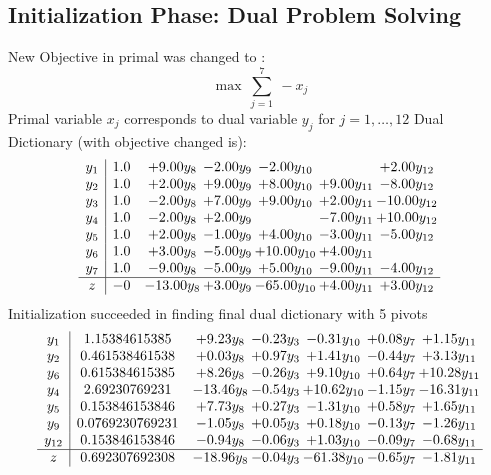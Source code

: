\documentclass[8pt]{article}
\begin{document}
\subsection{Initialization Phase: Dual Problem Solving}
New Objective in primal was changed to : \[ \max\ \sum_{j=1}^{7}\ - x_j \] 
Primal variable $x_j$ corresponds to dual variable $y_j$ for $j = 1,\ldots,12$
Dual Dictionary (with objective changed is): 
\[\begin{array}{c| c c@{\hskip 2pt} c@{\hskip 2pt} c@{\hskip 2pt} c@{\hskip 2pt} c@{\hskip 2pt} }
 y_{1}   &  1.0 & +  9.00 y_{8} & -2.00 y_{9} & -2.00 y_{10} &   & +  2.00 y_{12}\\
 y_{2}   &  1.0 & +  2.00 y_{8} & +  9.00 y_{9} & +  8.00 y_{10} & +  9.00 y_{11} & -8.00 y_{12}\\
 y_{3}   &  1.0 & -2.00 y_{8} & +  7.00 y_{9} & +  9.00 y_{10} & +  2.00 y_{11} & -10.00 y_{12}\\
 y_{4}   &  1.0 & -2.00 y_{8} & +  2.00 y_{9} &   & -7.00 y_{11} & + 10.00 y_{12}\\
 y_{5}   &  1.0 & +  2.00 y_{8} & -1.00 y_{9} & +  4.00 y_{10} & -3.00 y_{11} & -5.00 y_{12}\\
 y_{6}   &  1.0 & +  3.00 y_{8} & -5.00 y_{9} & + 10.00 y_{10} & +  4.00 y_{11} &   \\
 y_{7}   &  1.0 & -9.00 y_{8} & -5.00 y_{9} & +  5.00 y_{10} & -9.00 y_{11} & -4.00 y_{12}\\
\hline
z    &  -0 & -13.00 y_{8} & +  3.00 y_{9} & -65.00 y_{10} & +  4.00 y_{11} & +  3.00 y_{12}\\
\end{array}\]
Initialization succeeded in finding final dual dictionary with 5 pivots
\[\begin{array}{c| c c@{\hskip 2pt} c@{\hskip 2pt} c@{\hskip 2pt} c@{\hskip 2pt} c@{\hskip 2pt} }
 y_{1}   &  1.15384615385 & +  9.23 y_{8} & -0.23 y_{3} & -0.31 y_{10} & +  0.08 y_{7} & +  1.15 y_{11}\\
 y_{2}   &  0.461538461538 & +  0.03 y_{8} & +  0.97 y_{3} & +  1.41 y_{10} & -0.44 y_{7} & +  3.13 y_{11}\\
 y_{6}   &  0.615384615385 & +  8.26 y_{8} & -0.26 y_{3} & +  9.10 y_{10} & +  0.64 y_{7} & + 10.28 y_{11}\\
 y_{4}   &  2.69230769231 & -13.46 y_{8} & -0.54 y_{3} & + 10.62 y_{10} & -1.15 y_{7} & -16.31 y_{11}\\
 y_{5}   &  0.153846153846 & +  7.73 y_{8} & +  0.27 y_{3} & -1.31 y_{10} & +  0.58 y_{7} & +  1.65 y_{11}\\
 y_{9}   &  0.0769230769231 & -1.05 y_{8} & +  0.05 y_{3} & +  0.18 y_{10} & -0.13 y_{7} & -1.26 y_{11}\\
 y_{12}   &  0.153846153846 & -0.94 y_{8} & -0.06 y_{3} & +  1.03 y_{10} & -0.09 y_{7} & -0.68 y_{11}\\
\hline
z    &  0.692307692308 & -18.96 y_{8} & -0.04 y_{3} & -61.38 y_{10} & -0.65 y_{7} & -1.81 y_{11}\\
\end{array}\]
\end{document}
